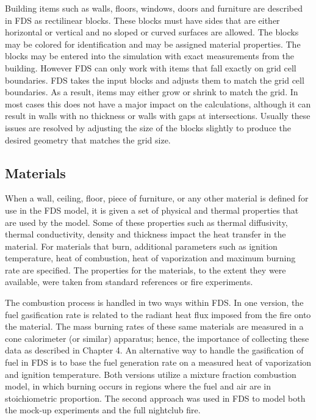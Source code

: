 \documentclass[11pt]{book}
\begin{document}
Building items such as walls, floors, windows, doors and furniture are described in FDS as rectilinear blocks. These blocks must have sides that are either horizontal or vertical and no sloped or curved surfaces are allowed. The blocks may be colored for identification and may be assigned material properties. The blocks may be entered into the simulation with exact measurements from the building. However FDS can only work with items that fall exactly on grid cell boundaries. FDS takes the input blocks and adjusts them to match the grid cell boundaries. As a result, items may either grow or shrink to match the grid. In most cases this does not have a major impact on the calculations, although it can result in walls with no thickness or walls with gaps at intersections. Usually these issues are resolved by adjusting the size of the blocks slightly to produce the desired geometry that matches the grid size.

\subsection{Materials}
When a wall, ceiling, floor, piece of furniture, or any other material is defined for use in the FDS model, it is given a set of physical and thermal properties that are used by the model. Some of these properties such as thermal diffusivity, thermal conductivity, density and thickness impact the heat transfer in the material. For materials that burn, additional parameters such as ignition temperature, heat of combustion, heat of vaporization and maximum burning rate are specified. The properties for the materials, to the extent they were available, were taken from standard references or fire experiments.

The combustion process is handled in two ways within FDS. In one version, the fuel gasification rate is related to the radiant heat flux imposed from the fire onto the material. The mass burning rates of these same materials are measured in a cone calorimeter (or similar) apparatus; hence, the importance of collecting these data as described in Chapter 4. An alternative way to handle the gasification of fuel in FDS is to base the fuel generation rate on a measured heat of vaporization and ignition temperature. Both versions utilize a mixture fraction combustion model, in which burning occurs in regions where the fuel and air are in stoichiometric proportion. The second approach was used in FDS to model both the mock-up experiments and the full nightclub fire.
\end{document}
